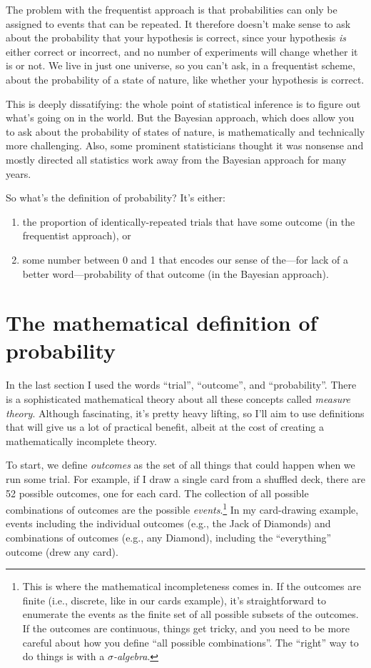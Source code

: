 The problem with the frequentist approach is that probabilities can only be
assigned to events that can be repeated. It therefore doesn't make sense to
ask about the probability that your hypothesis is correct, since your
hypothesis \emph{is} either correct or incorrect, and no number of experiments
will change whether it is or not. We live in just one universe, so you can't
ask, in a frequentist scheme, about the probability of a state of nature, like
whether your hypothesis is correct.

This is deeply dissatifying: the whole point of statistical inference is to
figure out what's going on in the world. But the Bayesian approach, which does
allow you to ask about the probability of states of nature, is mathematically
and technically more challenging. Also, some prominent statisticians thought
it was nonsense and mostly directed all statistics work away from the Bayesian
approach for many years.

So what's the definition of probability? It's either:
\begin{enumerate}
\item the proportion of identically-repeated trials that have some outcome (in the frequentist approach), or
\item some number between 0 and 1 that encodes our sense of the---for lack of a better word---probability of that outcome (in the Bayesian approach).
\end{enumerate}

\section{The mathematical definition of probability}

In the last section I used the words ``trial'', ``outcome'', and
``probability''.  There is a sophisticated mathematical theory about all these
concepts called \emph{measure theory}. Although fascinating, it's pretty heavy
lifting, so I'll aim to use definitions that will give us a lot of practical
benefit, albeit at the cost of creating a mathematically incomplete theory.

To start, we define \emph{outcomes} as the set of all things that could happen
when we run some trial. For example, if I draw a single card from a shuffled
deck, there are 52 possible outcomes, one for each card. The collection of all
possible combinations of outcomes are the possible
\emph{events}.\footnote{This is where the mathematical incompleteness comes
in. If the outcomes are finite (i.e., discrete, like in our cards example),
it's straightforward to enumerate the events as the finite set of all possible
subsets of the outcomes. If the outcomes are continuous, things get tricky,
and you need to be more careful about how you define ``all possible
combinations''. The ``right'' way to do things is with a
\emph{$\sigma$-algebra}.} In my card-drawing example, events including the
individual outcomes (e.g., the Jack of Diamonds) and combinations of outcomes
(e.g., any Diamond), including the ``everything'' outcome (drew any card).

